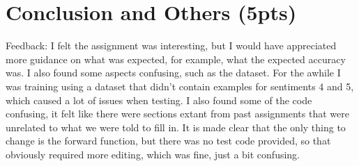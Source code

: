 \documentclass[conference]{IEEEtran}
\begin{document}
\section{Conclusion and Others (5pts)}

Feedback: I felt the assignment was interesting, but I would have appreciated more guidance on what was expected, for example, what the expected accuracy was. I also found some aspects confusing, such as the dataset. For the awhile I was training using a dataset that didn't contain examples for sentiments 4 and 5, which caused a lot of issues when testing. I also found some of the code confusing, it felt like there were sections extant from past assignments that were unrelated to what we were told to fill in. It is made clear that the only thing to change is the forward function, but there was no test code provided, so that obviously required more editing, which was fine, just a bit confusing.
\end{document}
